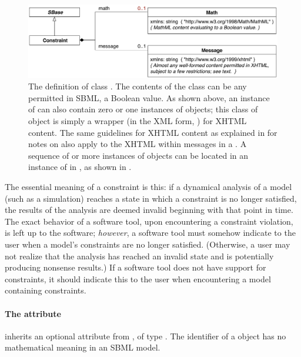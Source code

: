\begin{figure}[htb]
  \centering
  \small
  \vspace*{2ex}
  \includegraphics[scale=0.8]{figs/constraint-uml}
  \caption{The definition of class \Constraint.  The contents of
    the \Math class can be any \mathml permitted in SBML,
     a Boolean value.  As shown above, an
    instance of \Constraint can also contain zero or one instances
    of \Message objects; this class of object is simply a wrapper
    (in the XML form, ) for
    XHTML content.  The same guidelines for XHTML content as
    explained in  for notes on \SBaseUpright also
    apply to the XHTML within messages in a \Constraint. A
    sequence of  or more instances of \Constraint objects can
    be located in an instance of \ListOfConstraints in \Model, as
    shown in \protect{}.}
  \label{fig:constraint}
\end{figure}

The essential meaning of a constraint is this: if a dynamical
analysis of a model (such as a simulation) reaches a state in
which a constraint is no longer satisfied, the results of the
analysis are deemed invalid beginning with that point in time.
The exact behavior of a software tool, upon encountering a
constraint violation, is left up to the software; \emph{however},
a software tool must somehow indicate to the user when a model's
constraints are no longer satisfied.  (Otherwise, a user may not
realize that the analysis has reached an invalid state and is
potentially producing nonsense results.)  If a software tool does
not have support for constraints, it should indicate this to the
user when encountering a model containing constraints.


\begin{blockChanged}
\paragraph{The  attribute}
\label{sec:constraint-id}

\Constraint inherits an optional  attribute from \SBase, of type .  The identifier of a \Constraint object has no mathematical meaning in an SBML \thisLV model.

\end{blockChanged}


